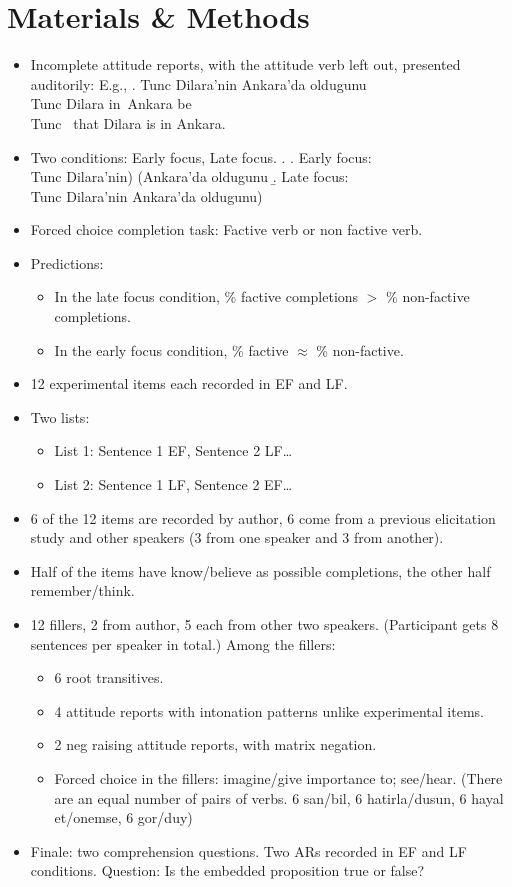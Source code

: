 \documentclass[11pt]{article}
\begin{document}
\section{Materials \& Methods}
\begin{itemize}
	\item Incomplete attitude reports, with the attitude verb left out, presented auditorily: E.g.,
		\exg. Tunc Dilara'nin Ankara'da oldugunu\\
		Tunc Dilara in~Ankara be\\
		\glt Tunc \gap\ that Dilara is in Ankara. 

	\item Two conditions: Early focus, Late focus.
		\ex. \a. Early focus:\\
		Tunc Dilara'nin) (Ankara'da oldugunu
		\b. Late focus:\\
		Tunc Dilara'nin Ankara'da oldugunu)
		
	\item Forced choice completion task: Factive verb or non factive verb.
	\item Predictions: 
		\begin{itemize}
			\item In the late focus condition, \% factive completions $>$ \% non-factive completions.
			\item In the early focus condition, \% factive $\approx$ \% non-factive.
		\end{itemize} 
	\item 12 experimental items each recorded in EF and LF.
	\item Two lists:
		\begin{itemize}
			\item List 1: Sentence 1 EF, Sentence 2 LF\ldots
			\item List 2: Sentence 1 LF, Sentence 2 EF\ldots
		\end{itemize}
	\item 6 of the 12 items are recorded by author, 6 come from a previous elicitation study and other speakers (3 from one speaker and 3 from another).
	\item Half of the items have know/believe as possible completions, the other half remember/think.
	\item 12 fillers, 2 from author, 5 each from other two speakers. (Participant gets 8 sentences per speaker in total.) Among the fillers:
		\begin{itemize}
			\item 6 root transitives.
			\item 4 attitude reports with intonation patterns unlike experimental items. 
			\item 2 neg raising attitude reports, with matrix negation.
			\item Forced choice in the fillers: imagine/give importance to; see/hear. (There are an equal number of pairs of verbs. 6 san/bil, 6 hatirla/dusun, 6 hayal et/onemse, 6 gor/duy)
		\end{itemize}
	\item Finale: two comprehension questions. Two ARs recorded in EF and LF conditions. Question: Is the embedded proposition true or false?
\end{itemize}
\end{document}
